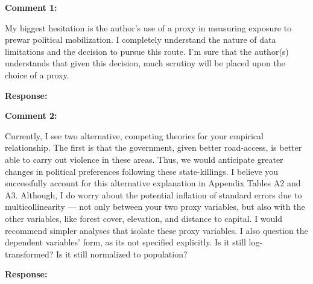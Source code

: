 \documentclass[12pt, a4paper, notitlepage]{article}
\begin{document}
\vspace{15pt}
\noindent\textbf{Comment 1:}
\begin{displayquote}
My biggest hesitation is the author’s use of a proxy in measuring exposure to prewar political mobilization. I completely understand the nature of data limitations and the decision to pursue this route. I’m sure that the author(s) understands that given this decision, much scrutiny will be placed upon the choice of a proxy.
\end{displayquote}

\noindent\textbf{Response:}

\vspace{15pt}
\noindent\textbf{Comment 2:}
\begin{displayquote}
Currently, I see two alternative, competing theories for your empirical relationship. The first is that the government, given better road-access, is better able to carry out violence in these areas. Thus, we would anticipate greater changes in political preferences following these state-killings. I believe you successfully account for this alternative explanation in Appendix Tables A2 and A3. Although, I do worry about the potential inflation of standard errors due to multicollinearity — not only between your two proxy variables, but also with the other variables, like forest cover, elevation, and distance to capital. I would recommend simpler analyses that isolate these proxy variables. I also question the dependent variables’ form, as its not specified explicitly. Is it still log- transformed? Is it still normalized to population?
\end{displayquote}

\noindent\textbf{Response:}
\end{document}
